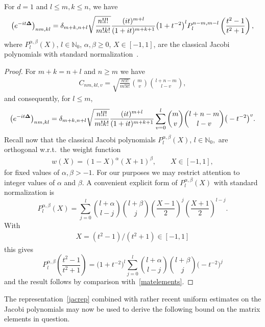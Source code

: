 \documentclass[pdftex]{sigma}
\begin{document}
\begin{lemma}
\label{jacobi}
For $d=1$ and $l\leq m,k\leq n$, we have
\begin{gather}\label{jacrep}
\left(e^{-it{\bf\Delta}}\right)_{nm,kl}=
\delta_{m+k,n+l}
\sqrt{\frac{n! l!}{m! k!}}
\frac{(it)^{m+l}}{(1+it)^{m+k+1}}\big(1+t^{-2}\big)^l
  P_{l}^{n-m,m-l}\left(\frac{t^2-1}{t^2+1}\right) ,
\end{gather}
where $P_l^{\alpha,\beta}(X)$, $l\in\mathbb N_0$, $\alpha,\beta\geq 0$,
$X\in[-1,1]$, are the classical Jacobi polynomials with standard
normalization~{\rm \cite{Szego}}.
\end{lemma}

\begin{proof}
For  $m+k=n+l$ and $n\geq m$ we have
\begin{gather*}
C_{nm,kl,v}
=\sqrt{\frac{n! l!}{m! k!}}{m\choose v}{l+n-m\choose l-v},
\end{gather*}
and consequently, for $l\leq m$,
\begin{gather}
\label{matelements}
\left(e^{-it{\bf\Delta}}\right)_{nm,kl}=
\delta_{m+k,n+l}\sqrt{\frac{n! l!}{m! k!}}
\frac{(it)^{m+l}}{(1+it)^{m+k+1}}
\sum_{v=0}^{l} {m\choose v}{l+n-m\choose l-v}
 \big(-t^{-2}\big)^{v} .
\end{gather}
Recall now \cite{Szego} that the classical Jacobi polynomials
$P_l^{\alpha,\beta}(X)$, $l\in\mathbb N_0,$ are orthogonal
w.r.t.\ the weight function
\begin{gather}\label{weight}
w(X)   =  (1-X)^\alpha(X+1)^\beta,\qquad X\in[-1,1],
\end{gather}
for f\/ixed values of $\alpha, \beta > -1$. For our purposes we may
restrict attention to integer values of $\alpha$ and  $\beta$. A  convenient
explicit form of $P_l^{\alpha,\beta}(X)$ with standard normalization is
\[
P_l^{\alpha,\beta}(X)=\sum_{j=0}^l{l+\alpha\choose l-j}{l+\beta\choose
  j}\left(\frac{X-1}{2}\right)^j\left(\frac{X+1}{2}\right)^{l-j} .
\]
With
\begin{gather}\label{X-t}
X=(t^2-1)/(t^2+1)\in [-1,1]
\end{gather}
this gives
\[
P_l^{\alpha,\beta}\left(\frac{t^2-1}{t^2+1}\right)
= \big(1+t^{-2}\big)^l\sum_{j=0}^l{l+\alpha\choose l-j}
{l+\beta\choose j}\big(-t^{-2}\big)^{j}
\]
and the result follows by comparison with~\eqref{matelements}.
\end{proof}

The representation~\eqref{jacrep} combined with rather recent
uniform estimates on the Jacobi polynomials may now be used to derive the
following bound on the matrix elements in question.
\end{document}
